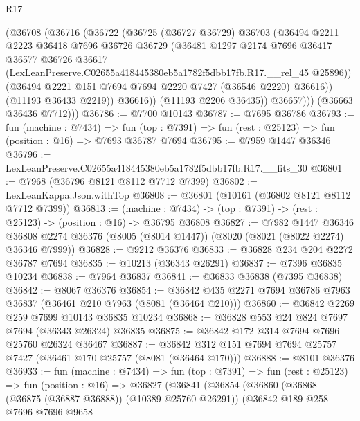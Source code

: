 \begin{lexlean}{R17}
\begin{coremodule}
              (@36708
                (@36716
                  (@36722
                    (@36725
                      (@36727 @36729)
                      @36703
                      (@36494
                        @2211
                        @2223
                        @36418
                        @7696
                        @36726
                        @36729
                        (@36481
                          @1297
                          @2174
                          @7696
                          @36417
                          @36577
                          @36726
                          @36617
                          (LexLeanPreserve.C02655a418445380eb5a1782f5dbb17fb.R17.__rel_45 @25896))
                        (@36494 @2221 @151 @7694 @7694 @2220 @7427 (@36546 @2220) @36616))
                      (@11193 @36433 @2219))
                    @36616))
                (@11193 @2206 @36435))
              @36657)))
        (@36663 @36436 @7712)))
@36786 := @7700 @10143
@36787 := @7695 @36786
@36793 := fun (machine : @7434) =>
  fun (top : @7391) => fun (rest : @25123) => fun (position : @16) => @7693 @36787 @7694
@36795 := @7959 @1447 @36346
@36796 := LexLeanPreserve.C02655a418445380eb5a1782f5dbb17fb.R17.__fits_30
@36801 := @7968 (@36796 @8121 @8112 @7712 @7399)
@36802 := LexLeanKappa.Json.withTop
@36808 := @36801 (@10161 (@36802 @8121 @8112 @7712 @7399))
@36813 := (machine : @7434) -> (top : @7391) -> (rest : @25123) -> (position : @16) -> @36795 @36808
@36827 := @7982
    @1447
    @36346
    @36808
    @2274
    @36376
    (@8005 (@8014 @1447))
    (@8020 (@8021 (@8022 @2274) @36346 @7999))
@36828 := @9212 @36376
@36833 := @36828 @234 @204 @2272 @36787 @7694
@36835 := @10213 (@36343 @26291)
@36837 := @7396 @36835 @10234
@36838 := @7964 @36837
@36841 := @36833 @36838 (@7395 @36838)
@36842 := @8067 @36376
@36854 := @36842 @435 @2271 @7694 @36786 @7963 @36837 (@36461 @210 @7963 (@8081 (@36464 @210)))
@36860 := @36842 @2269 @259 @7699 @10143 @36835 @10234
@36868 := @36828 @553 @24 @824 @7697 @7694 (@36343 @26324) @36835
@36875 := @36842 @172 @314 @7694 @7696 @25760 @26324 @36467
@36887 := @36842 @312 @151 @7694 @7694 @25757 @7427 (@36461 @170 @25757 (@8081 (@36464 @170)))
@36888 := @8101 @36376
@36933 := fun (machine : @7434) =>
  fun (top : @7391) =>
  fun (rest : @25123) =>
  fun (position : @16) =>
  @36827
    (@36841
      (@36854
        (@36860
          (@36868 (@36875 (@36887 @36888)) (@10389 @25760 @26291))
          (@36842
            @189
            @258
            @7696
            @7696
            @9658

\end{coremodule}
\end{lexlean}
